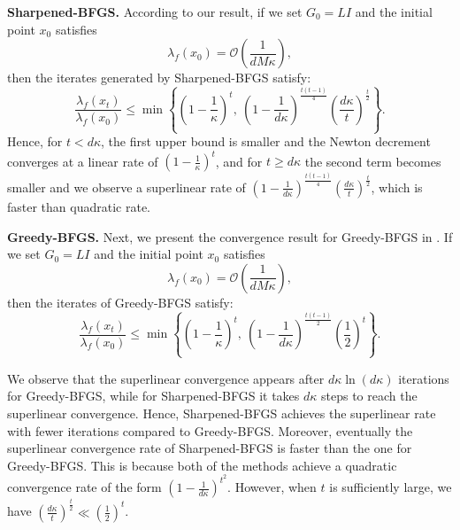 \documentclass[11pt]{article}
\numberwithin{assumption}{section}
\numberwithin{remark}{section}
\numberwithin{theorem}{section}
\begin{document}
\noindent \textbf{Sharpened-BFGS.} According to our result, if we set $G_0 = LI$ and the initial point $x_0$ satisfies
\begin{equation*}
    \lambda_f(x_0) = \mathcal{O}\left(\frac{1}{dM\kappa}\right),
\end{equation*}
then the iterates generated by Sharpened-BFGS satisfy:
\begin{equation*}
\frac{\lambda_f(x_t)}{\lambda_f(x_0)} \leq
\min\left\{\left(1 \!-\! \frac{1}{\kappa}\right)^t ,\  \left(1 \!-\! \frac{1}{d\kappa}\right)^{\!\frac{t(t - 1)}{4}}\!\! \left(\frac{d\kappa}{t}\right)^{\frac{t}{2}} \right\}.
\end{equation*}
Hence, for $t< d\kappa$, the first upper bound is smaller and the Newton decrement converges at a linear rate of $(1-\frac{1}{\kappa})^t$, and for $t\geq d\kappa $ the second term becomes smaller and we observe a superlinear rate of $(1 \!-\! \frac{1}{d\kappa})^{\frac{t(t - 1)}{4}} (\frac{d\kappa}{t})^{\frac{t}{2}}$, which is faster than quadratic rate.

\noindent \textbf{Greedy-BFGS.} Next, we present the convergence result for Greedy-BFGS in  \cite{rodomanov2020greedy}. If we set $G_0 = LI$ and the initial point $x_0$ satisfies
\begin{equation*}
    \lambda_f(x_0) = \mathcal{O}\left(\frac{1}{dM\kappa}\right),
\end{equation*}
then the iterates of Greedy-BFGS satisfy:
\begin{equation*}
\frac{\lambda_f(x_t)}{\lambda_f(x_0)} \leq
\min\left\{\left(1 \!-\! \frac{1}{\kappa}\right)^t ,\  \left(1 \!-\! \frac{1}{d\kappa}\right)^{\!\frac{t(t - 1)}{2}}\!\! \left(\frac{1}{2}\right)^{t} \right\}.
\end{equation*}

We observe that the superlinear convergence appears after $d\kappa\ln{(d\kappa)}$ iterations for Greedy-BFGS, while for Sharpened-BFGS it takes $d\kappa$ steps to reach the superlinear convergence. Hence, Sharpened-BFGS achieves the superlinear rate with fewer iterations compared to Greedy-BFGS. Moreover, eventually the superlinear convergence rate of Sharpened-BFGS is faster than the one for Greedy-BFGS. This is because both of the methods achieve a quadratic convergence rate of the form $(1 - \frac{1}{d\kappa})^{t^2}$. However, when $t$ is sufficiently large, we have $
(\frac{d\kappa}{t})^{\frac{t}{2}} \ll (\frac{1}{2})^{t}$.
\end{document}
